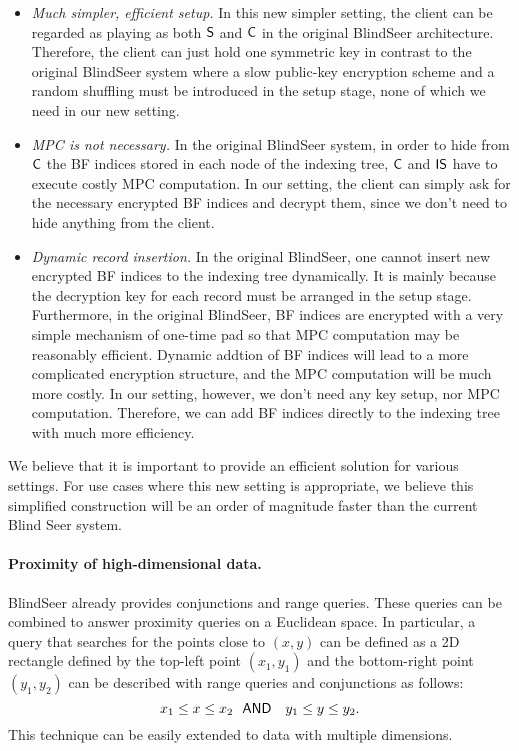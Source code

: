 \begin{itemize}\setlength\itemsep{0em}
\item {\em Much simpler, efficient setup.}
In this new simpler setting, the client can be regarded as playing as both $\sf
 S$ and $\sf C$ in the original BlindSeer architecture. Therefore, the client can just hold one symmetric
 key in contrast to the original BlindSeer system where a slow public-key
 encryption scheme and a random shuffling must be introduced in the setup
 stage, none of which we need in our new setting. 

\item {\em MPC is not necessary.} In the original BlindSeer system, in order to
hide from $\sf C$ the BF indices stored in each node of the indexing tree, $\sf
C$ and $\sf IS$ have to execute costly MPC computation. In our setting, the
client can simply ask for the necessary encrypted BF indices and decrypt
them, since we don't need to hide anything from the client.  


\item {\em Dynamic record insertion.} In the original BlindSeer, one cannot
insert new encrypted BF indices to the indexing tree dynamically.  It is mainly
because the decryption key for each record must be arranged in the setup
stage.
%
Furthermore, in the original BlindSeer, BF indices are encrypted with a very
    simple mechanism of one-time pad so that MPC computation may be reasonably
    efficient. Dynamic addtion of BF indices will lead to a more complicated
    encryption structure, and the MPC computation will be much more costly.
In our setting, however, we don't need any key setup, nor MPC computation.
Therefore, we can add BF indices directly to the indexing tree with much more
efficiency.  
\end{itemize}

\noindent We believe that it is important to provide an efficient solution for various
settings. For use cases where this new setting is appropriate, we believe this simplified
construction will be an order of magnitude faster than the current Blind Seer system.

\paragraph{Proximity of high-dimensional data.}
BlindSeer already provides conjunctions and range queries.  These queries can be combined to answer proximity queries on a Euclidean space.
In particular, a query that searches for the points close to $(x, y)$ can be defined as a 2D rectangle defined by the top-left point $(x_1, y_1)$ and the
bottom-right point $(y_1, y_2)$ can be described with range queries and
conjunctions as follows: $$ x_1 \le x \le x_2 ~~{\sf AND}~~~ y_1 \le y \le y_2.
$$ This technique can be easily extended to data with multiple dimensions. 

